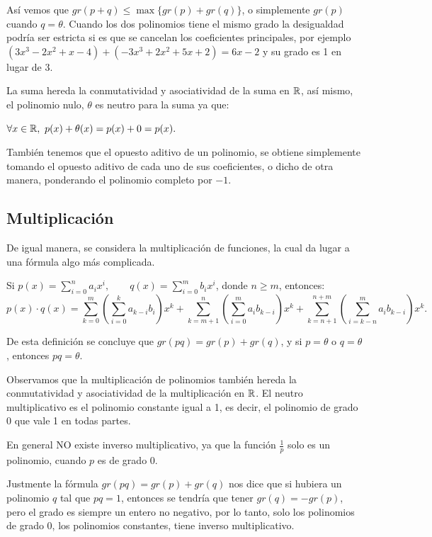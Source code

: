 Así vemos que $gr(p+q)\le\max\{gr(p)+gr(q)\}$, o simplemente $gr(p)$ cuando $q=\theta$.
Cuando los dos polinomios tiene el mismo grado la desigualdad podría ser estricta si es que se cancelan los coeficientes principales, por ejemplo $(3x^3-2x^2+x-4)+(-3x^3+2x^2+5x+2)=6x-2$ y su grado es 1 en lugar de 3.

La suma hereda la conmutatividad y asociatividad de la suma en $\mathbb{R}$, así mismo, el polinomio nulo, $\theta$ es neutro para la suma ya que:

$\forall x\in\R,\ p(x)+\theta(x)=p(x)+0=p(x).$

También tenemos que el opuesto aditivo de un polinomio, se obtiene simplemente tomando el opuesto aditivo de cada uno de sus coeficientes, o dicho de otra manera, ponderando el polinomio completo por $-1$.

\subsection{Multiplicación}
De igual manera, se considera la multiplicación de funciones, la cual da lugar a una fórmula algo más complicada.

\medskip

\begin{defn}
 Si $p(x)=\sum_{i=0}^n a_ix^i,\qquad q(x)=\sum_{i=0}^m b_ix^i $, donde $n\ge m$, entonces:
$$p(x)\cdot q(x)=\sum_{k=0}^{m} \left(\sum_{i=0}^ka_{k-i}b_{i}\right)x^k
+\sum_{k=m+1}^{n} \left(\sum_{i=0}^ma_ib_{k-i}\right)x^k
+\sum_{k=n+1}^{n+m} \left(\sum_{i=k-n}^ma_ib_{k-i}\right)x^k. $$
\end{defn}

De esta definición se concluye que $gr(pq)=gr(p)+gr(q)$, y si $p=\theta$ o $q=\theta$, entonces $pq=\theta$.

Observamos que la multiplicación de polinomios también hereda la conmutatividad y asociatividad de la multiplicación en $\mathbb{R}$.
El neutro multiplicativo es el polinomio constante igual a 1, es decir, el polinomio de grado 0 que vale 1 en todas partes.

En general NO existe inverso multiplicativo, ya que la función $\frac{1}{p}$ solo es un polinomio, cuando $p$ es de grado 0.

Justmente la fórmula $gr(pq)=gr(p)+gr(q)$ nos dice que si hubiera un polinomio $q$ tal que $pq=1$, entonces se tendría que tener $gr(q)=-gr(p)$, pero el grado es siempre un entero no negativo, por lo tanto, solo los polinomios de grado 0, los polinomios constantes, tiene inverso multiplicativo.

